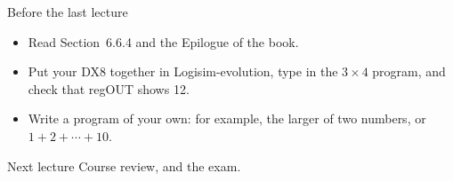 \documentclass[10pt]{wosm-slides}
\begin{document}
\begin{frame}{Before the last lecture}
  \begin{itemize}
    \item Read Section~6.6.4 and the Epilogue of the book.
    \item Put your DX8 together in Logisim-evolution, type in the $3 \times 4$
      program, and check that regOUT shows 12.
    \item Write a program of your own: for example, the larger of two numbers, or
      $1 + 2 + \cdots + 10$.
  \end{itemize}

  \begin{block}{Next lecture }
    Course review, and the exam.
  \end{block}
\end{frame}
\end{document}
